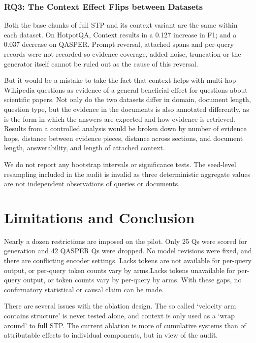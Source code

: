 \documentclass[10pt,a4paper]{article}
\begin{document}
\subsubsection{RQ3: The Context Effect Flips between Datasets}

Both the base chunks of full STP and its context variant are the same within each dataset. On HotpotQA, Context results in a 0.127 increase in F1; and a 0.037 decrease on QASPER. Prompt reversal, attached spans and per-query records were not recorded so evidence coverage, added noise, truncation or the generator itself cannot be ruled out as the cause of this reversal.

But it would be a mistake to take the fact that context helps with multi-hop Wikipedia questions as evidence of a general beneficial effect for questions about scientific papers. Not only do the two datasets differ in domain, document length, question type, but the evidence in the documents is also annotated differently, as is the form in which the answers are expected and how evidence is retrieved. Results from a controlled analysis would be broken down by number of evidence hops, distance between evidence pieces, distance across sections, and document length, answerability, and length of attached context.

We do not report any bootstrap intervals or significance tests. The seed-level resampling included in the audit is invalid as three deterministic aggregate values are not independent observations of queries or documents.

\section{Limitations and Conclusion}
\label{sec:limitations}

Nearly a dozen restrictions are imposed on the pilot. Only 25 Qs were scored for generation and 42 QASPER Qs were dropped. No model revisions were fixed, and there are conflicting encoder settings. Lacks tokens are not available for per-query output, or per-query token counts vary by arms.Lacks tokens unavailable for per-query output, or token counts vary by per-query by arms. With these gaps, no confirmatory statistical or causal claim can be made.

There are several issues with the ablation design. The so called ‘velocity arm contains structure' is never tested alone, and context is only used as a ‘wrap around' to full STP. The current ablation is more of cumulative systems than of attributable effects to individual components, but in view of the audit.
\end{document}
